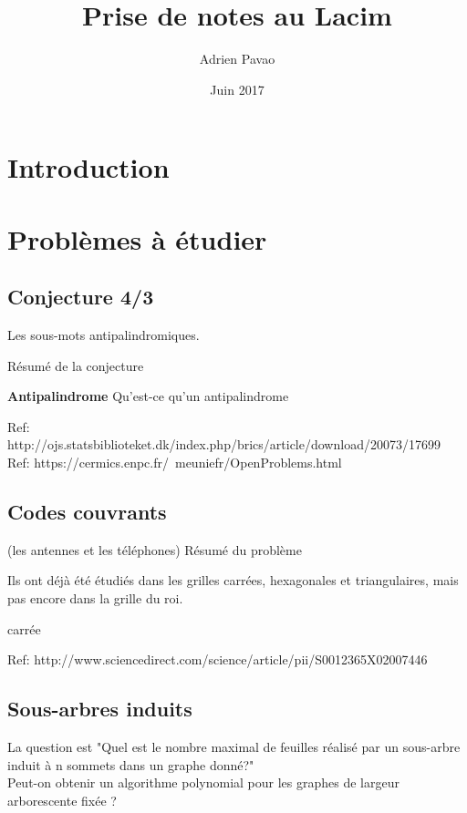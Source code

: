 \documentclass{article}
\title{Prise de notes au Lacim}
\author{Adrien Pavao}
\date{Juin 2017}
\begin{document}
\maketitle

\section{Introduction}

\section{Problèmes à étudier}

\subsection{Conjecture 4/3} 

Les sous-mots antipalindromiques.

Résumé de la conjecture

\textbf{Antipalindrome}
Qu'est-ce qu'un antipalindrome

Ref: http://ojs.statsbiblioteket.dk/index.php/brics/article/download/20073/17699
Ref: https://cermics.enpc.fr/~meuniefr/OpenProblems.html

\subsection{Codes couvrants} 

(les antennes et les téléphones)
Résumé du problème

Ils ont déjà été étudiés dans les grilles carrées, hexagonales et triangulaires, mais pas encore dans la grille du roi.
 
\subsubseciogrille carrée

Ref: http://www.sciencedirect.com/science/article/pii/S0012365X02007446

\subsection{Sous-arbres induits}

La question est "Quel est le nombre maximal de feuilles réalisé par un sous-arbre induit à n sommets dans un graphe donné?"
\\
Peut-on obtenir un algorithme polynomial pour les graphes de largeur arborescente fixée ?
\end{document}
